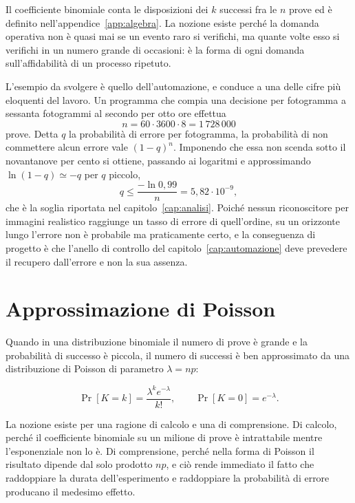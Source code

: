 Il coefficiente binomiale conta le disposizioni dei $k$ successi fra le $n$ prove ed è definito nell'appendice~\ref{app:algebra}. La nozione esiste perché la domanda operativa non è quasi mai se un evento raro si verifichi, ma quante volte esso si verifichi in un numero grande di occasioni: è la forma di ogni domanda sull'affidabilità di un processo ripetuto.

L'esempio da svolgere è quello dell'automazione, e conduce a una delle cifre più eloquenti del lavoro. Un programma che compia una decisione per fotogramma a sessanta fotogrammi al secondo per otto ore effettua
\begin{equation}
n = 60 \cdot 3600 \cdot 8 = 1\,728\,000
\end{equation}
prove. Detta $q$ la probabilità di errore per fotogramma, la probabilità di non commettere alcun errore vale $(1-q)^n$. Imponendo che essa non scenda sotto il novantanove per cento si ottiene, passando ai logaritmi e approssimando $\ln(1-q) \simeq -q$ per $q$ piccolo,
\begin{equation}
q \le \frac{-\ln 0{,}99}{n} = 5{,}82 \cdot 10^{-9},
\end{equation}
che è la soglia riportata nel capitolo~\ref{cap:analisi}. Poiché nessun riconoscitore per immagini realistico raggiunge un tasso di errore di quell'ordine, su un orizzonte lungo l'errore non è probabile ma praticamente certo, e la conseguenza di progetto è che l'anello di controllo del capitolo~\ref{cap:automazione} deve prevedere il recupero dall'errore e non la sua assenza.

\section{Approssimazione di Poisson}

Quando in una distribuzione binomiale il numero di prove è grande e la probabilità di successo è piccola, il numero di successi è ben approssimato da una distribuzione di Poisson di parametro $\lambda = np$:

\begin{equation}
\Pr[K = k] = \frac{\lambda^k e^{-\lambda}}{k!}, \qquad \Pr[K = 0] = e^{-\lambda}.
\end{equation}

La nozione esiste per una ragione di calcolo e una di comprensione. Di calcolo, perché il coefficiente binomiale su un milione di prove è intrattabile mentre l'esponenziale non lo è. Di comprensione, perché nella forma di Poisson il risultato dipende dal solo prodotto $np$, e ciò rende immediato il fatto che raddoppiare la durata dell'esperimento e raddoppiare la probabilità di errore producano il medesimo effetto.

